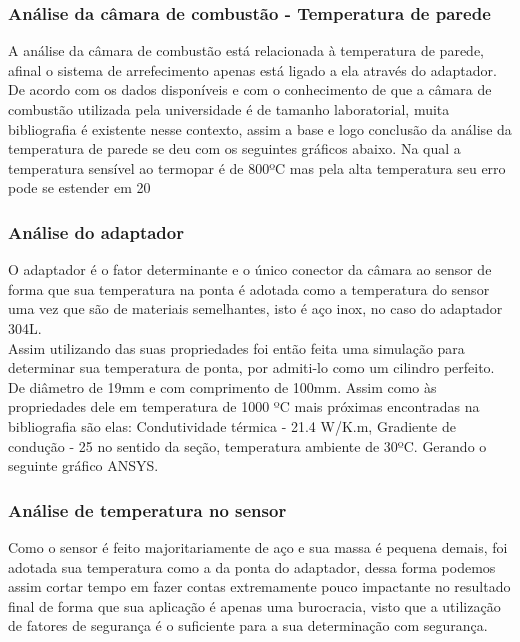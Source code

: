 \subsubsection{Análise da câmara de combustão - Temperatura de parede}

A análise da câmara de combustão está relacionada à temperatura de parede, afinal o sistema de arrefecimento apenas está ligado a ela através do adaptador. De acordo com os dados disponíveis e com o conhecimento de que a câmara de combustão utilizada pela universidade é de tamanho laboratorial, muita bibliografia é existente nesse contexto, assim a base e logo conclusão da análise da temperatura de parede se deu com os seguintes gráficos abaixo. Na qual a temperatura sensível ao termopar é de 800ºC mas pela alta temperatura seu erro pode se estender em 20%

\subsubsection{Análise do adaptador}
O adaptador é o fator determinante e o único conector da câmara ao sensor de forma que sua temperatura na ponta é adotada como a temperatura do sensor uma vez que são de materiais semelhantes, isto é aço inox, no caso do adaptador 304L.\\

Assim utilizando das suas propriedades foi então feita uma simulação para determinar sua temperatura de ponta, por admiti-lo como um cilindro perfeito. De diâmetro de 19mm e com comprimento de 100mm. Assim como às propriedades dele em temperatura de 1000 ºC mais próximas encontradas na bibliografia são elas: Condutividade térmica - 21.4 W/K.m, Gradiente de condução - 25 no sentido da seção, temperatura ambiente de 30ºC. Gerando o seguinte gráfico ANSYS.

\subsubsection{Análise de temperatura no sensor}
Como o sensor é feito majoritariamente de aço e sua massa é pequena demais, foi adotada sua temperatura como a da ponta do adaptador, dessa forma podemos assim cortar tempo em fazer contas extremamente pouco impactante no resultado final de forma que sua aplicação é apenas uma burocracia, visto que a utilização de fatores de segurança é o suficiente para a sua determinação com segurança.

